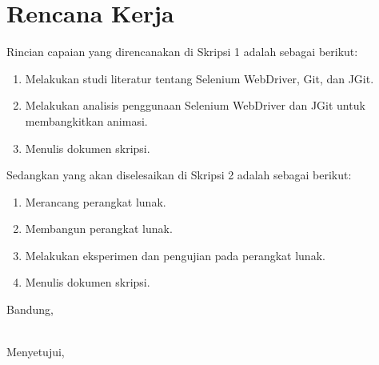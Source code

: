 \documentclass[a4paper,twoside]{article}
\begin{document}
\section{Rencana Kerja}
Rincian capaian yang direncanakan di Skripsi 1 adalah sebagai berikut:
\begin{enumerate}
\item Melakukan studi literatur tentang Selenium WebDriver, Git, dan JGit.
\item Melakukan analisis penggunaan Selenium WebDriver dan JGit untuk membangkitkan animasi.
\item Menulis dokumen skripsi.
\end{enumerate}

Sedangkan yang akan diselesaikan di Skripsi 2 adalah sebagai berikut:
\begin{enumerate}
\item Merancang perangkat lunak.
\item Membangun perangkat lunak.
\item Melakukan eksperimen dan pengujian pada perangkat lunak.
\item Menulis dokumen skripsi. 
\end{enumerate}

\vspace{1cm}
\centering Bandung, \tanggal\\
\vspace{2cm} \nama \\ 
\vspace{1cm}

Menyetujui, \\
\end{document}
